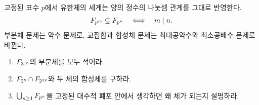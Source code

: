 \begin{keyidea}
고정된 표수 $p$에서 유한체의 세계는 양의 정수의 나눗셈 관계를 그대로 반영한다.
\[
  F_{p^m}\subseteq F_{p^n}
  \quad\Longleftrightarrow\quad m\mid n.
\]
부분체 문제는 약수 문제로, 교집합과 합성체 문제는 최대공약수와 최소공배수 문제로 바뀐다.
\end{keyidea}

\begin{checkpoint}
\begin{enumerate}[label=(\alph*)]
  \item $F_{3^{18}}$의 부분체를 모두 적어라.
  \item $F_{2^8}\cap F_{2^{12}}$와 두 체의 합성체를 구하라.
  \item $\bigcup_{n\ge1}F_{p^n}$을 고정된 대수적 폐포 안에서 생각하면 왜 체가 되는지 설명하라.
\end{enumerate}
\end{checkpoint}
